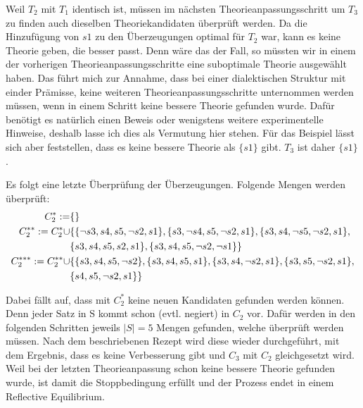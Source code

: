 \documentclass{article}
\begin{document}
 Weil $T_2$ mit $T_1$ identisch ist, müssen im nächsten Theorieanpassungsschritt um $T_3$ zu finden auch dieselben Theoriekandidaten überprüft werden. Da die Hinzufügung von $s1$ zu den Überzeugungen optimal für $T_2$ war, kann es keine Theorie geben, die besser passt. Denn wäre das der Fall, so müssten wir in einem der vorherigen Theorieanpassungsschritte eine suboptimale Theorie ausgewählt haben. Das führt mich zur Annahme, dass bei einer dialektischen Struktur mit einder Prämisse, keine weiteren Theorieanpassungsschritte unternommen werden müssen, wenn in einem Schritt keine bessere Theorie gefunden wurde. Dafür benötigt es natürlich einen Beweis oder wenigstens weitere experimentelle Hinweise, deshalb lasse ich dies als Vermutung hier stehen. Für das Beispiel lässt sich aber feststellen, dass es keine bessere Theorie als $\{s1\}$ gibt. $T_3$ ist daher $\{s1\}$.
 
 Es folgt eine letzte Überprüfung der Überzeugungen. Folgende Mengen werden überprüft:
 \begin{align}
    C_2^{*}:= &\{\}\\
    C_2^{**}:= C_2^{*} \cup &\{\{\neg s3, s4, s5, \neg s2, s1\}, \{s3, \neg s4, s5, \neg s2, s1\}, \{s3, s4, \neg s5, \neg s2, s1\},\\ \notag
    &\{s3, s4, s5, s2, s1\}, \{s3, s4, s5, \neg s2, \neg s1\}\}\\
    C_2^{***}:= C_2^{**} \cup &\{\{s3, s4, s5, \neg s2\}, \{s3, s4, s5, s1\}, \{s3, s4, \neg s2, s1\}, \{s3, s5, \neg s2, s1\},\\ \notag
    &\{s4, s5, \neg s2, s1\}\}
 \end{align}
 
 Dabei fällt auf, dass mit $C_2^{*}$ keine neuen Kandidaten gefunden werden können. Denn jeder Satz in S kommt schon (evtl. negiert) in $C_2$ vor. Dafür werden in den folgenden Schritten jeweils $\lvert S \rvert = 5$ Mengen gefunden, welche überprüft werden müssen.
 Nach dem beschriebenen Rezept wird diese wieder durchgeführt, mit dem Ergebnis, dass es keine Verbesserung gibt und $C_3$ mit $C_2$ gleichgesetzt wird. Weil bei der letzten Theorieanpassung schon keine bessere Theorie gefunden wurde, ist damit die Stoppbedingung erfüllt und der Prozess endet in einem Reflective Equilibrium.
 
\end{document}
